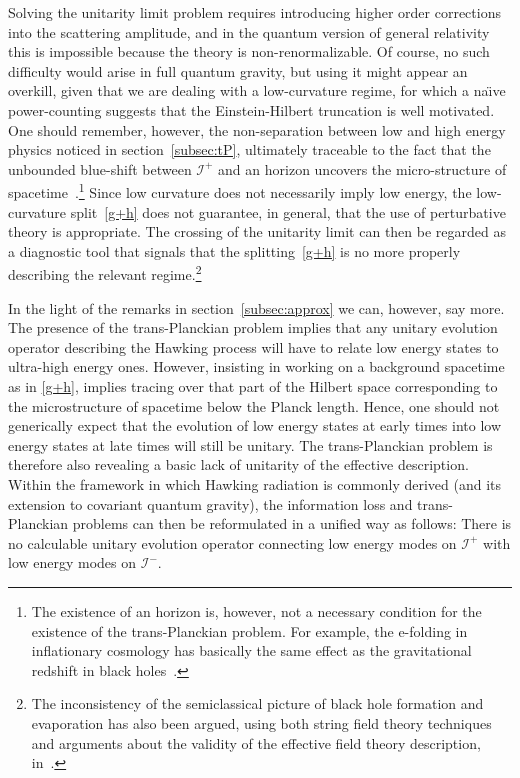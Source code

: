\documentclass[prd,groupedaddress, showpacs, showkeys, onecolumn, nofootinbib, 12pt]{revtex4-2}
\newcommand{\scri}{\mathscr{I}}
\begin{document}
Solving the unitarity limit problem requires introducing higher order corrections into the scattering amplitude, and in the quantum version of general relativity this is impossible because the theory is non-renormalizable.  Of course, no such difficulty would arise in full quantum gravity, but using it might appear an overkill, given that we are dealing with a low-curvature regime, for which a na\"{\i}ve power-counting suggests that the Einstein-Hilbert truncation is well motivated.  One should remember, however, the non-separation between low and high energy physics noticed in section~\ref{subsec:tP}, ultimately traceable to the fact that the unbounded blue-shift between $\scri^+$ and an horizon uncovers the micro-structure of spacetime~\cite{Jacobson:1995ak}.\footnote{The existence of an horizon is, however, not a necessary condition for the existence of the trans-Planckian problem.  For example, the e-folding in inflationary cosmology has basically the same effect as the gravitational redshift in black holes~\cite{Brandenberger:1999sw, Martin:2000xs, Brandenberger:2009rs}.}  Since low curvature does not necessarily imply low energy, the low-curvature split~\eqref{g+h} does not guarantee, in general, that the use of perturbative theory is appropriate.  The crossing of the unitarity limit can then be regarded as a diagnostic tool that signals that the splitting~\eqref{g+h} is no more properly describing the relevant regime.\footnote{The inconsistency of the semiclassical picture of black hole formation and evaporation has also been argued, using both string field theory techniques and arguments about the validity of the effective field theory description, in~\cite{Giddings:2006sj,Kiem:1995iy,Lowe:1995ac,Giddings:2004ud,Giddings:2006be,Giddings:2007ie}.}

In the light of the remarks in section~\ref{subsec:approx} we can, however, say more.  The presence of the trans-Planckian problem implies that any unitary evolution operator describing the Hawking process will have to relate low energy states to ultra-high energy ones.
However, insisting in working on  a background spacetime as in \eqref{g+h},  implies tracing over that part of the Hilbert space corresponding to the microstructure of spacetime below the Planck length. Hence, one should not generically expect that the evolution of low energy states at early times into low energy states at late times will still be unitary.  The trans-Planckian problem is therefore also revealing a basic lack of unitarity of the effective description.  Within the framework in which Hawking radiation is commonly derived (and its extension to covariant quantum gravity), the information loss and trans-Planckian problems can then be reformulated in a unified way as follows:  There is no calculable unitary evolution operator connecting low energy modes on $\scri^+$ with low energy modes on $\scri^-$.
 
\end{document}
